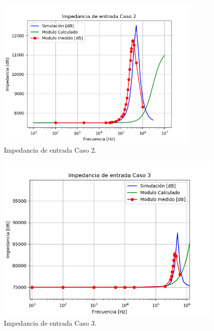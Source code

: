 \begin{figure}[H]	
	\centering
	\includegraphics[width=0.9\textwidth]{Ejercicio1/Imagenes/CZinC2.png}
	\caption{Impedancia de entrada Caso 2.}
	\label{fig:CompZinC2}
\end{figure} 
\begin{figure}[H]	
	\centering
	\includegraphics[width=\textwidth]{Ejercicio1/Imagenes/CZinC3.png}
	\caption{Impedancia de entrada Caso 3.}
	\label{fig:CompZinC3}
\end{figure} 

